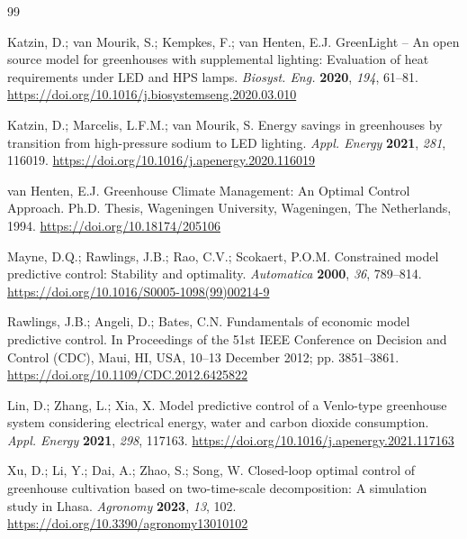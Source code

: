 \begin{thebibliography}{99}
\small

Katzin, D.; van Mourik, S.; Kempkes, F.; van Henten, E.J. GreenLight -- An open source
model for greenhouses with supplemental lighting: Evaluation of heat requirements under LED
and HPS lamps. \textit{Biosyst. Eng.} \textbf{2020}, \textit{194}, 61--81.
\url{https://doi.org/10.1016/j.biosystemseng.2020.03.010}

Katzin, D.; Marcelis, L.F.M.; van Mourik, S. Energy savings in greenhouses by transition
from high-pressure sodium to LED lighting. \textit{Appl. Energy} \textbf{2021},
\textit{281}, 116019. \url{https://doi.org/10.1016/j.apenergy.2020.116019}

van Henten, E.J. Greenhouse Climate Management: An Optimal Control Approach. Ph.D. Thesis,
Wageningen University, Wageningen, The Netherlands, 1994.
\url{https://doi.org/10.18174/205106}

Mayne, D.Q.; Rawlings, J.B.; Rao, C.V.; Scokaert, P.O.M. Constrained model predictive
control: Stability and optimality. \textit{Automatica} \textbf{2000}, \textit{36}, 789--814.
\url{https://doi.org/10.1016/S0005-1098(99)00214-9}

Rawlings, J.B.; Angeli, D.; Bates, C.N. Fundamentals of economic model predictive control.
In Proceedings of the 51st IEEE Conference on Decision and Control (CDC), Maui, HI, USA,
10--13 December 2012; pp. 3851--3861. \url{https://doi.org/10.1109/CDC.2012.6425822}

Lin, D.; Zhang, L.; Xia, X. Model predictive control of a Venlo-type greenhouse system
considering electrical energy, water and carbon dioxide consumption. \textit{Appl. Energy}
\textbf{2021}, \textit{298}, 117163. \url{https://doi.org/10.1016/j.apenergy.2021.117163}

Xu, D.; Li, Y.; Dai, A.; Zhao, S.; Song, W. Closed-loop optimal control of greenhouse
cultivation based on two-time-scale decomposition: A simulation study in Lhasa.
\textit{Agronomy} \textbf{2023}, \textit{13}, 102.
\url{https://doi.org/10.3390/agronomy13010102}


\end{thebibliography}
